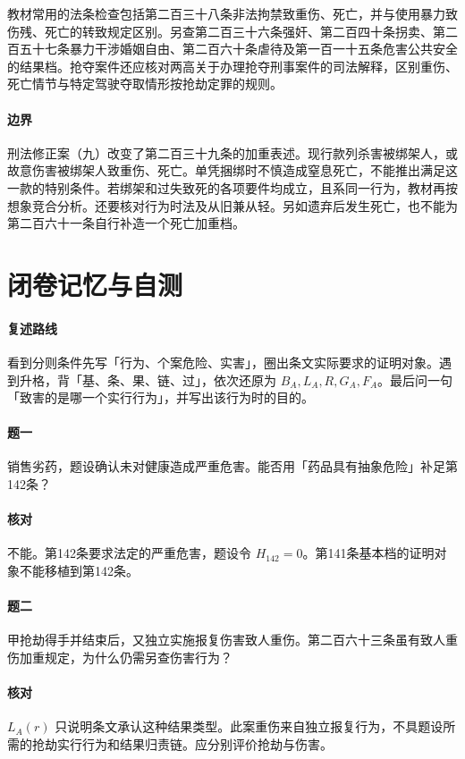 教材常用的法条检查包括第二百三十八条非法拘禁致重伤、死亡，并与使用暴力致伤残、死亡的转致规定区别。另查第二百三十六条强奸、第二百四十条拐卖、第二百五十七条暴力干涉婚姻自由、第二百六十条虐待及第一百一十五条危害公共安全的结果档。抢夺案件还应核对两高关于办理抢夺刑事案件的司法解释，区别重伤、死亡情节与特定驾驶夺取情形按抢劫定罪的规则。

\paragraph{边界}
刑法修正案（九）改变了第二百三十九条的加重表述。现行款列杀害被绑架人，或故意伤害被绑架人致重伤、死亡。单凭捆绑时不慎造成窒息死亡，不能推出满足这一款的特别条件。若绑架和过失致死的各项要件均成立，且系同一行为，教材再按想象竞合分析。还要核对行为时法及从旧兼从轻。另如遗弃后发生死亡，也不能为第二百六十一条自行补造一个死亡加重档。

\section*{闭卷记忆与自测}

\paragraph{复述路线}
看到分则条件先写「行为、个案危险、实害」，圈出条文实际要求的证明对象。遇到升格，背「基、条、果、链、过」，依次还原为 $B_A,L_A,R,G_A,F_A$。最后问一句「致害的是哪一个实行行为」，并写出该行为时的目的。

\paragraph{题一}
销售劣药，题设确认未对健康造成严重危害。能否用「药品具有抽象危险」补足第142条？

\paragraph{核对}
不能。第142条要求法定的严重危害，题设令 $H_{142}=0$。第141条基本档的证明对象不能移植到第142条。

\paragraph{题二}
甲抢劫得手并结束后，又独立实施报复伤害致人重伤。第二百六十三条虽有致人重伤加重规定，为什么仍需另查伤害行为？

\paragraph{核对}
$L_A(r)$ 只说明条文承认这种结果类型。此案重伤来自独立报复行为，不具题设所需的抢劫实行行为和结果归责链。应分别评价抢劫与伤害。
